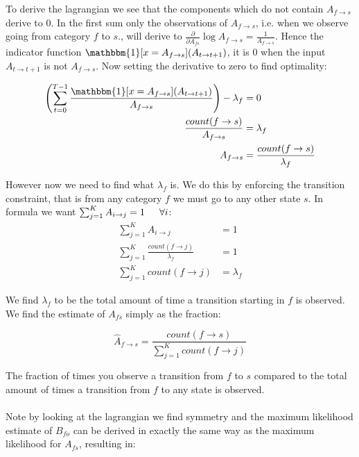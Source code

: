 To derive the lagrangian we see that the components which do not contain $A_{f\rightarrow s}$ derive to $0$. In the first sum only the observations of $A_{f\rightarrow s}$, i.e. when we observe going from category $f$ to $s$., will derive to $\frac{\partial}{\partial A_{fs}} \log A_{f\rightarrow s} = \frac{1}{A_{f\rightarrow s}}$. Hence the indicator function $\mathbbm{1}[x = A_{f\rightarrow s}](A_{t\rightarrow t+1})$, it is $0$ when the input $A_{t\rightarrow t+1}$ is not $A_{f\rightarrow s}$. Now setting the derivative to zero to find optimality:

\begin{equation}
	\begin{split}
	\left(\sum_{t=0}^{T-1} \frac{\mathbbm{1}[x = A_{f\rightarrow s}](A_{t\rightarrow t+1})}{A_{f\rightarrow s}}\right) - \lambda_{f} &= 0\\
	\frac{count(f\rightarrow s)}{A_{f\rightarrow s}} &= \lambda_f\\
	A_{f\rightarrow s} &= \frac{count({f\rightarrow s})}{\lambda_{f}}
	\end{split}
\end{equation}
	
However now we need to find what $\lambda_f$ is. We do this by enforcing the transition constraint, that is from any category $f$ we must go to any other state $s$. In formula we want $\sum_{j=1}^{K} A_{i\rightarrow j} = 1 \indent \forall i$:
\begin{equation}
	\begin{split}
	\sum_{j=1}^{K} A_{i\rightarrow j} &= 1\\
	\sum_{j=1}^{K} \frac{count({f\rightarrow j})}{\lambda_{f}} &= 1\\
	\sum_{j=1}^{K} count({f\rightarrow j}) &= \lambda_f
	\end{split}
\end{equation}
	
We find $\lambda_f$ to be the total amount of time a transition starting in $f$ is observed. We find the estimate of $A_{fs}$ simply as the fraction:

\begin{equation}
	\hat{A}_{f\rightarrow s} = \frac{count({f\rightarrow s})}{\sum_{j=1}^{K} count({f\rightarrow j})}
\end{equation}
	
The fraction of times you observe a transition from $f$ to $s$ compared to the total amount of times a transition from $f$ to any state is observed.
\\\\
Note by looking at the lagrangian we find symmetry and the maximum likelihood estimate of $B_{fo}$ can be derived in exactly the same way as the maximum likelihood for $A_{fs}$, resulting in:

